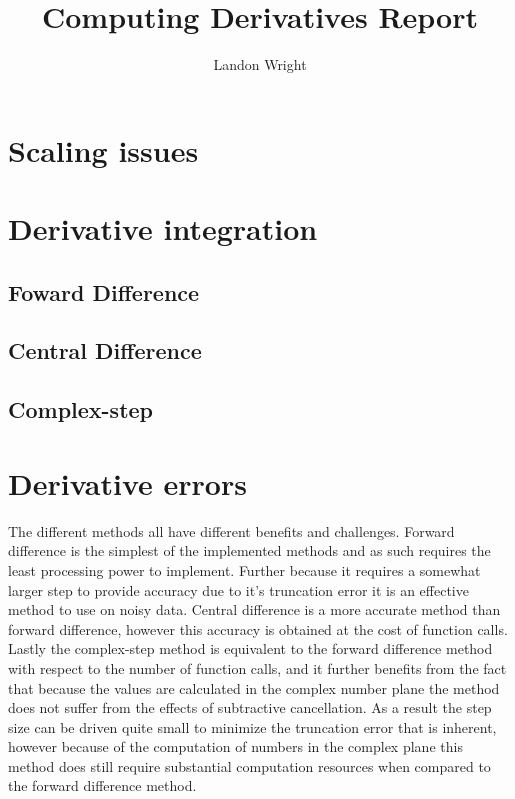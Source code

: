 \documentclass{article}
\begin{document}
\singlespacing
\title{Computing Derivatives Report}
\author{Landon Wright}
\maketitle

\section{Scaling issues}

\section{Derivative integration}
\subsection{Foward Difference}
\subsection{Central Difference}
\subsection{Complex-step}

\section{Derivative errors}
The different methods all have different benefits and challenges.
Forward difference is the simplest of the implemented methods and as such requires the least processing power to implement.
Further because it requires a somewhat larger step to provide accuracy due to it's truncation error it is an effective method to use on noisy data.
Central difference is a more accurate method than forward difference, however this accuracy is obtained at the cost of function calls.
Lastly the complex-step method is equivalent to the forward difference method with respect to the number of function calls,
and it further benefits from the fact that because the values are calculated in the complex number plane the method does not suffer from the effects of subtractive cancellation.
As a result the step size can be driven quite small to minimize the truncation error that is inherent,
however because of the computation of numbers in the complex plane this method does still require substantial computation resources when compared to the forward difference method.
\end{document}
